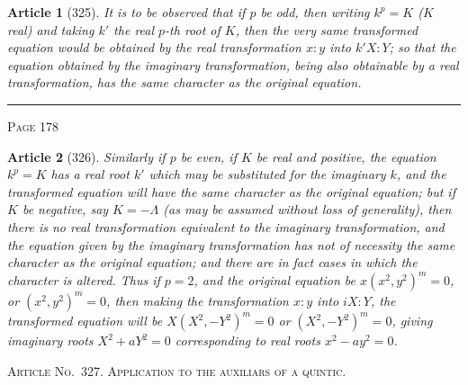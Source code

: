 \documentclass[11pt,a4paper]{article}
\theoremstyle{cayley}
\newtheorem{art}{Article}
\begin{document}
\begin{art}[325]
It is to be observed that if $p$ be odd, then writing $k^p = K$ ($K$ real) and taking $k'$ the real $p$-th root of $K$, then the very same transformed equation would be obtained by the real transformation $x:y$ into $k'X:Y$; so that the equation obtained by the imaginary transformation, being also obtainable by a real transformation, has the same character as the original equation.
\end{art}

\vspace{1em}
\noindent\rule{\textwidth}{0.4pt}
\begin{center}\textsc{Page 178}\end{center}
\newpage

\begin{art}[326]
Similarly if $p$ be even, if $K$ be real and positive, the equation $k^p = K$ has a real root $k'$ which may be substituted for the imaginary $k$, and the transformed equation will have the same character as the original equation; but if $K$ be negative, say $K = -\Lambda$ (as may be assumed without loss of generality), then there is no real transformation equivalent to the imaginary transformation, and the equation given by the imaginary transformation has not of necessity the same character as the original equation; and there are in fact cases in which the character is altered. Thus if $p=2$, and the original equation be $x(x^2, y^2)^m = 0$, or $(x^2, y^2)^m = 0$, then making the transformation $x:y$ into $iX:Y$, the transformed equation will be $X(X^2, -Y^2)^m = 0$ or $(X^2, -Y^2)^m = 0$, giving imaginary roots $X^2 + aY^2 = 0$ corresponding to real roots $x^2 - ay^2 = 0$.
\end{art}

\begin{center}
\textsc{Article No.\ 327. Application to the auxiliars of a quintic.}
\end{center}
\end{document}
